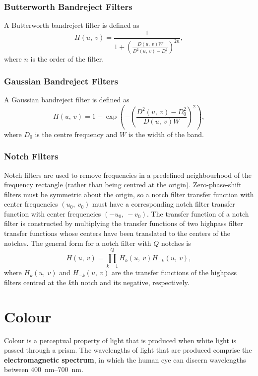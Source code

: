 \documentclass{article}
\begin{document}
\subsubsection{Butterworth Bandreject Filters}
A Butterworth bandreject filter is defined as
\begin{equation*}
    H\left( u,\: v \right) = \frac{1}{1 + \left( \frac{D\left( u,\: v \right)W}{D^2\left( u,\: v \right) - D_0^2} \right)^{2n}},
\end{equation*}
where \(n\) is the order of the filter.
\subsubsection{Gaussian Bandreject Filters}
A Gaussian bandreject filter is defined as
\begin{equation*}
    H\left( u,\: v \right) = 1 - \exp{\left( - \left( \frac{D^2\left( u,\: v \right) - D_0^2}{D\left( u,\: v \right)W} \right)^2 \right)},
\end{equation*}
where \(D_0\) is the centre frequency and \(W\) is the width of the band.
\subsubsection{Notch Filters}
Notch filters are used to remove frequencies in a predefined
neighbourhood of the frequency rectangle (rather than being centred at
the origin). Zero-phase-shift filters must be symmetric about the
origin, so a notch filter transfer function with center frequencies
\(\left( u_0,\: v_0 \right)\) must have a corresponding notch filter
transfer function with center frequencies \(\left( -u_0,\: -v_0
\right)\). The transfer function of a notch filter is constructed by
multiplying the transfer functions of two highpass filter transfer
functions whose centers have been translated to the centers of the
notches. The general form for a notch filter with \(Q\) notches is
\begin{equation*}
    H\left( u,\: v \right) = \prod_{k=1}^Q H_k\left( u,\: v \right) H_{-k}\left( u,\: v \right),
\end{equation*}
where \(H_k\left( u,\: v \right)\) and \(H_{-k}\left( u,\: v \right)\)
are the transfer functions of the highpass filters centred at the
\(k\)th notch and its negative, respectively.
\section{Colour}
Colour is a perceptual property of light that is produced when white
light is passed through a prism. The wavelengths of light that are
produced comprise the \textbf{electromagnetic spectrum}, in which the
human eye can discern wavelengths between \qtyrange[range-phrase={ and
}]{400}{700}{nm}.
\end{document}
